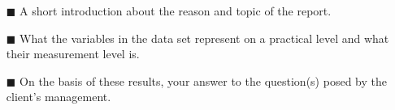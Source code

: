 \begin{itemize}
    \item[$\blacksquare$] A short introduction about the reason and topic of the report.
    \item[$\blacksquare$] What the variables in the data set represent on a practical level and what their measurement level is. 
    
    \item[$\blacksquare$] On the basis of these results, your answer to the question(s) posed by the client's management.
\end{itemize}

\clearpage %